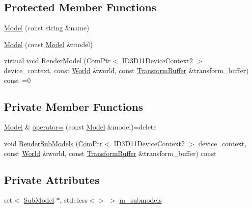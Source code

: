 \subsection*{Protected Member Functions}
\begin{DoxyCompactItemize}
\item 
\hyperlink{classmage_1_1_model_adc37cc2030a93cde5da20f9a941c060e}{Model} (const string \&name)
\item 
\hyperlink{classmage_1_1_model_ac5f1d340bbfefd30bec3e6343a86059a}{Model} (const \hyperlink{classmage_1_1_model}{Model} \&model)
\item 
virtual void \hyperlink{classmage_1_1_model_a7879cd7c98cefbaf325ee71832275265}{Render\+Model} (\hyperlink{namespacemage_ae74f374780900893caa5555d1031fd79}{Com\+Ptr}$<$ I\+D3\+D11\+Device\+Context2 $>$ device\+\_\+context, const \hyperlink{classmage_1_1_world}{World} \&world, const \hyperlink{structmage_1_1_transform_buffer}{Transform\+Buffer} \&transform\+\_\+buffer) const =0
\end{DoxyCompactItemize}
\subsection*{Private Member Functions}
\begin{DoxyCompactItemize}
\item 
\hyperlink{classmage_1_1_model}{Model} \& \hyperlink{classmage_1_1_model_a563515c64ec39cfcda9f6ca37576391b}{operator=} (const \hyperlink{classmage_1_1_model}{Model} \&model)=delete
\item 
void \hyperlink{classmage_1_1_model_aa7f89b4f08adde59e27f3eb06428c17f}{Render\+Sub\+Models} (\hyperlink{namespacemage_ae74f374780900893caa5555d1031fd79}{Com\+Ptr}$<$ I\+D3\+D11\+Device\+Context2 $>$ device\+\_\+context, const \hyperlink{classmage_1_1_world}{World} \&world, const \hyperlink{structmage_1_1_transform_buffer}{Transform\+Buffer} \&transform\+\_\+buffer) const
\end{DoxyCompactItemize}
\subsection*{Private Attributes}
\begin{DoxyCompactItemize}
\item 
set$<$ \hyperlink{classmage_1_1_sub_model}{Sub\+Model} $\ast$, std\+::less$<$$>$ $>$ \hyperlink{classmage_1_1_model_a86c68c03650c206afa9c0a0b09a849e3}{m\+\_\+submodels}
\end{DoxyCompactItemize}



